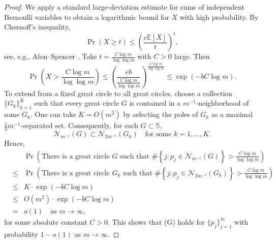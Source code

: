 \documentclass[12pt,reqno]{amsart}
\newcommand{\E}{\mathbb{E}}
\newcommand{\Nc}{\mathcal{N}}
\newcommand{\Sb}{\mathbb{S}}
\theoremstyle{plain}
\theoremstyle{definition}
\theoremstyle{remark}
\numberwithin{equation}{section}
\begin{document}
\begin{proof}
We apply a standard large-deviation estimate for sums of independent Bernoulli variables to obtain a logarithmic bound for $X$ with high probability. By Chernoff’s inequality,
$$\Pr(X\ge t)\le\left(\frac{e\E[X]}{t}\right)^t,$$
see, e.g., Alon–Spencer \cite[Section A.1]{AS}. Take $t=\frac{C\log m}{\log\log m}$ with $C>0$ large. Then
$$\Pr\left(X>\frac{C\log m}{\log\log m}\right)\le\left(\frac{eb}{\frac{C\log m}{\log\log m}}\right)^{\frac{C\log m}{\log\log m}}\le\exp\left(-bC\log m\right).$$
To extend from a fixed great circle to all great circles, choose a collection $\{G_k\}_{k=1}^K$ such that every great circle $G$ is contained in a $m^{-1}$-neighborhood of some $G_k$. One can take $K=O(m^2)$ by selecting the poles of $G_k$ as a maximal $\frac13m^{-1}$-separated set. Consequently, for each $G\subset\Sb$,
$$\Nc_{m^{-1}}(G)\subset\Nc_{2m^{-1}}\left(G_k\right)\quad\text{for some }k=1,...,K.$$
Hence,
\begin{eqnarray*} 
&&\Pr\left(\text{There is a great circle }G\text{ such that }\#\left\{j:p_j\in\Nc_{m^{-1}}(G)\right\}>\frac{C\log m}{\log\log m}\right)\\ 
&\le&\Pr\left(\text{There is a great circle }G_k\text{ such that }\#\left\{j:p_j\in\Nc_{2m^{-1}}\left(G_k\right)\right\}>\frac{C\log m}{\log\log m}\right)\\ 
&\le&K\cdot\exp\left(-bC\log m\right)\\ 
&\le&O\left(m^2\right)\cdot\exp\left(-bC\log m\right)\\ 
&=&o(1)\quad\text{as }m\to\infty, 
\end{eqnarray*}
for some absolute constant $C>0$. This shows that (G) holds for $\{p_j\}_{j=1}^m$ with probability $1-o(1)$ as $m\to\infty$.
\end{proof}
\end{document}
